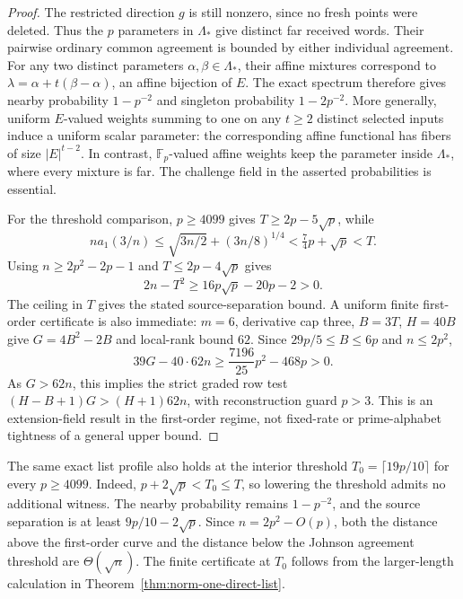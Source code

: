 \begin{proof}
The restricted direction $g$ is still nonzero, since no fresh points
were deleted. Thus the $p$ parameters in $\Lambda_*$ give distinct
far received words. Their pairwise ordinary common agreement is bounded
by either individual agreement. For any two distinct parameters
$\alpha,\beta\in\Lambda_*$, their affine mixtures correspond to
$\lambda=\alpha+t(\beta-\alpha)$, an affine bijection of $E$.
The exact spectrum therefore gives nearby probability $1-p^{-2}$
and singleton probability $1-2p^{-2}$.
More generally, uniform $E$-valued weights summing to one on any
$t\ge2$ distinct selected inputs induce a uniform scalar parameter:
the corresponding affine functional has fibers of size $|E|^{t-2}$.
In contrast, $\mathbb F_p$-valued affine weights keep the parameter
inside $\Lambda_*$, where every mixture is far. The challenge field
in the asserted probabilities is essential.

For the threshold comparison, $p\ge4099$ gives $T\ge2p-5\sqrt p$,
while
\[
 n a_1(3/n)\le\sqrt{3n/2}+(3n/8)^{1/4}
 <\tfrac74p+\sqrt p<T.
\]
Using $n\ge2p^2-2p-1$ and $T\le2p-4\sqrt p$ gives
\[
 2n-T^2\ge16p\sqrt p-20p-2>0.
\]
The ceiling in $T$ gives the stated source-separation bound.
A uniform finite first-order certificate is also immediate:
$m=6$, derivative cap three, $B=3T$, $H=40B$ give
$G=4B^2-2B$ and local-rank bound $62$. Since
$29p/5\le B\le6p$ and $n\le2p^2$,
\[
 39G-40\cdot62n\ge\frac{7196}{25}p^2-468p>0.
\]
As $G>62n$, this implies the strict graded row test
$(H-B+1)G>(H+1)62n$, with reconstruction guard $p>3$.
This is an extension-field result in the first-order regime, not
fixed-rate or prime-alphabet tightness of a general upper bound.
\end{proof}

The same exact list profile also holds at the interior threshold
$T_0=\lceil19p/10\rceil$ for every $p\ge4099$.
Indeed, $p+2\sqrt p<T_0\le T$, so lowering the threshold admits no
additional witness. The nearby probability remains $1-p^{-2}$,
and the source separation is at least $9p/10-2\sqrt p$.
Since $n=2p^2-O(p)$, both the distance above the first-order curve
and the distance below the Johnson agreement threshold are
$\Theta(\sqrt n)$. The finite certificate at $T_0$ follows from
the larger-length calculation in Theorem~\ref{thm:norm-one-direct-list}.
